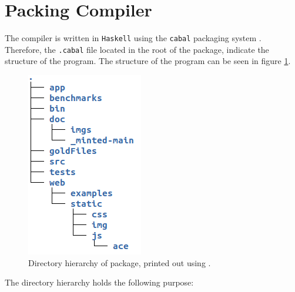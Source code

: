 \section{Packing Compiler \rr}
The \lan compiler is written in \texttt{Haskell} using the \texttt{cabal} packaging system
\cite{cabal}. Therefore, the \texttt{.cabal} file located in the root of the package, indicate
the structure of the program. The structure of the program can be seen in figure
\ref{fig:structure}.

\begin{figure}[H]
    \centering
    \includegraphics[scale=0.7]{imgs/directory-structure.png}
    \caption{Directory hierarchy of \lan package, printed out using .}
    \label{fig:structure}
\end{figure}
\noindent
The directory hierarchy holds the following purpose:

